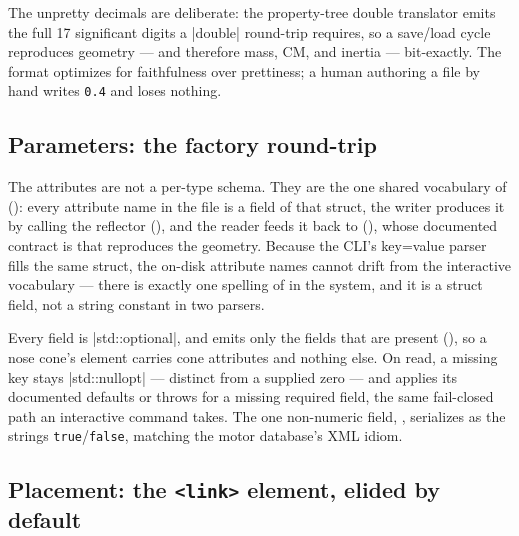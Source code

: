 The unpretty decimals are deliberate: the property-tree double translator emits the full
17 significant digits a \cppinline|double| round-trip requires, so a save/load cycle
reproduces geometry --- and therefore mass, CM, and inertia --- bit-exactly. The format
optimizes for faithfulness over prettiness; a human authoring a file by hand writes
\texttt{0.4} and loses nothing.

\subsection{Parameters: the factory round-trip}\label{sec:serialization-params}

The  attributes are not a per-type schema. They are the one shared
vocabulary of  (): every attribute
name in the file is a field of that struct, the writer produces it by calling the
reflector  (), and the reader
feeds it back to 
(), whose documented contract is that
 reproduces the geometry. Because the CLI's 
key=value parser fills the same struct, the on-disk attribute names cannot drift from the
interactive vocabulary --- there is exactly one spelling of  in the
system, and it is a struct field, not a string constant in two parsers.

Every field is \cppinline|std::optional|, and  emits only the fields
that are present (), so a nose cone's element
carries cone attributes and nothing else. On read, a missing key stays
\cppinline|std::nullopt| --- distinct from a supplied zero --- and  applies
its documented defaults or throws for a missing required field, the same fail-closed path
an interactive command takes. The one non-numeric field, , serializes as the
strings \texttt{true}/\texttt{false}, matching the motor database's XML idiom.

\subsection[Placement: the <link> element, elided by default]{Placement: the \texttt{<link>} element, elided by default}
\label{sec:serialization-link}

